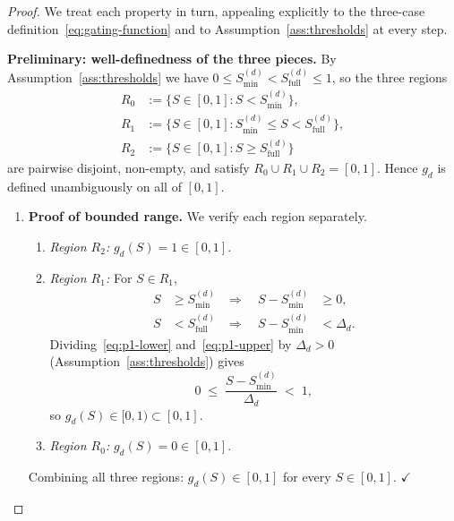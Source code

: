 \documentclass[12pt,openany]{book}
\numberwithin{equation}{chapter}
\theoremstyle{plain}
\theoremstyle{definition}
\theoremstyle{remark}
\def\mathcal#1{#1}%
\begin{document}
\begin{proof}
We treat each property in turn, appealing explicitly to the
three-case definition~\eqref{eq:gating-function} and to
Assumption~\ref{ass:thresholds} at every step.

\medskip
\noindent\textbf{Preliminary: well-definedness of the three
pieces.}
By Assumption~\ref{ass:thresholds} we have
$0 \leq \mathcal{S}_{\min}^{(d)} < \mathcal{S}_{\mathrm{full}}^{(d)} \leq 1$,
so the three regions
\begin{align}
  R_0 &:= \bigl\{\mathcal{S} \in [0,1]
            : \mathcal{S} < \mathcal{S}_{\min}^{(d)}\bigr\},
  \label{eq:R0}\\
  R_1 &:= \bigl\{\mathcal{S} \in [0,1]
            : \mathcal{S}_{\min}^{(d)} \leq \mathcal{S}
              < \mathcal{S}_{\mathrm{full}}^{(d)}\bigr\},
  \label{eq:R1}\\
  R_2 &:= \bigl\{\mathcal{S} \in [0,1]
            : \mathcal{S} \geq \mathcal{S}_{\mathrm{full}}^{(d)}\bigr\}
  \label{eq:R2}
\end{align}
are pairwise disjoint, non-empty, and satisfy $R_0 \cup R_1 \cup R_2 = [0,1]$.
Hence $g_d$ is defined unambiguously on all of $[0,1]$.

\bigskip
\begin{enumerate}
\item \textbf{Proof of bounded range.}
We verify each region separately.
\begin{enumerate}
  \item \emph{Region $R_2$:} $g_d(\mathcal{S}) = 1 \in [0,1]$.
  \item \emph{Region $R_1$:} For $\mathcal{S} \in R_1$,
        \begin{align}
          \mathcal{S} &\geq \mathcal{S}_{\min}^{(d)}
          &\Longrightarrow\quad
          \mathcal{S} - \mathcal{S}_{\min}^{(d)} &\geq 0,
          \label{eq:p1-lower}\\
          \mathcal{S} &< \mathcal{S}_{\mathrm{full}}^{(d)}
          &\Longrightarrow\quad
          \mathcal{S} - \mathcal{S}_{\min}^{(d)}
            &< \Delta_d.
          \label{eq:p1-upper}
        \end{align}
        Dividing~\eqref{eq:p1-lower} and~\eqref{eq:p1-upper} by
        $\Delta_d > 0$ (Assumption~\ref{ass:thresholds}) gives
        \[
          0 \;\leq\;
          \frac{\mathcal{S} - \mathcal{S}_{\min}^{(d)}}{\Delta_d}
          \;<\; 1,
        \]
        so $g_d(\mathcal{S}) \in [0,1)  \subset [0,1]$.
  \item \emph{Region $R_0$:} $g_d(\mathcal{S}) = 0 \in [0,1]$.
\end{enumerate}
Combining all three regions: $g_d(\mathcal{S}) \in [0,1]$
for every $\mathcal{S} \in [0,1]$. \hfill$\checkmark$


\end{enumerate}
\end{proof}
\end{document}

